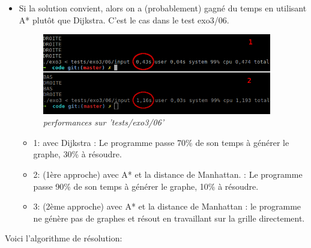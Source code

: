 \documentclass[10pt]{article}
\begin{document}
			\begin{itemize}[label=-]
				\setlength\itemsep{0.1em}
				\item Si la solution convient, alors on a (probablement) gagné du temps en utilisant A*
				plutôt que Dijkstra. C'est le cas dans le test exo3/06.
				
				\begin{figure}[H]
					\begin{center}
						\includegraphics[width=10cm,height=\textheight,keepaspectratio]{./images/manhattan_performances.png}
					\end{center}
					\caption{\textit{performances sur 'tests/exo3/06'}}
				\end{figure}
				\begin{itemize}[label=-]
					\setlength\itemsep{0.1em}
					\item 1: avec Dijkstra : Le programme passe 70\% de son temps à générer le graphe, 30\% à résoudre.
					\item 2: (1ère approche) avec A* et la distance de Manhattan. : Le programme passe 90\%
					de son temps à générer le graphe, 10\% à résoudre.
					\item 3: (2ème approche) avec A* et la distance de Manhattan : le programme ne génère pas de graphes et résout
					en travaillant sur la grille directement.
				\end{itemize}

				
			\end{itemize}
			Voici l'algorithme de résolution:
\end{document}
